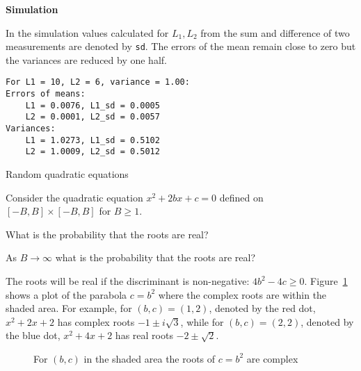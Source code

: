 \textbf{Simulation}

In the simulation values calculated for $L_1,L_2$ from the sum and difference of two measurements are denoted by \texttt{sd}. The errors of the mean remain close to zero but the variances are reduced by one half.

\begin{verbatim}
For L1 = 10, L2 = 6, variance = 1.00:
Errors of means:
    L1 = 0.0076, L1_sd = 0.0005
    L2 = 0.0001, L2_sd = 0.0057
Variances:
    L1 = 1.0273, L1_sd = 0.5102
    L2 = 1.0009, L2_sd = 0.5012
\end{verbatim}


\begin{prob}{Random quadratic equations}

Consider the quadratic equation $x^2+2bx+c=0$ defined on $[-B,B]\times[-B,B]$ for $B\geq 1$.

 What is the probability that the roots are real?

 As $B\rightarrow \infty$ what is the probability that the roots are real?
\end{prob}

\solution{}

The roots will be real if the discriminant is non-negative: $4b^2-4c\geq 0$. Figure~\ref{f.real-roots} shows a plot of the parabola $c=b^2$ where the complex roots are within the shaded area. For example, for $(b,c)=(1,2)$, denoted by the red dot, $x^2+2x+2$ has complex roots $-1\pm i\sqrt{3}$, while for $(b,c)=(2,2)$, denoted by the blue dot, $x^2+4x+2$ has real roots $-2\pm \sqrt{2}$.
\begin{figure}[tb]
\begin{center}
\end{center}
\caption{For $(b,c)$ in the shaded area the roots of $c=b^2$ are complex}\label{f.real-roots}
\end{figure}

